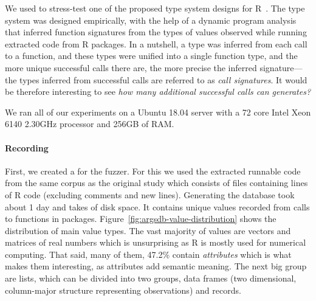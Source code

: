 \documentclass[sigplan,anonymous,review]{acmart}
\begin{document}
We used \tool to stress-test one of the proposed type system designs for R~\cite{turcotte2020designing}.
The type system was designed empirically, with the help of a dynamic program analysis that inferred function signatures from the types of values observed while running extracted code from R packages.
In a nutshell, a type was inferred from each call to a function, and these types were unified into a single function type, and the more unique successful calls there are, the more precise the inferred signature---the types inferred from successful calls are referred to as \textit{call signatures}.
It would be therefore interesting to see \emph{how many additional successful calls can \tool generates?}

We ran all of our experiments on a Ubuntu 18.04 server with a 72 core Intel Xeon 6140 2.30GHz processor and 256GB of RAM. 

\paragraph{Recording}

First, we created a \sxpdb for the fuzzer.
For this we used the extracted runnable code from the same corpus as the original study which consists of \DBNumSourceFiles files containing \DBSourceLinesOfCodeRnd lines of R code (excluding comments and new lines).
Generating the database took about 1 day  and takes \DBFileSize of disk space.
It contains \DBValuesRnd unique values recorded from \DBNumCallsRnd calls to \DBNumFunctionsRnd functions in \DBNumPackages packages.
Figure~\ref{fig:argsdb-value-distribution} shows the distribution of main value types.
The vast majority of values are vectors and matrices of real numbers which is unsurprising as R is mostly used for numerical computing.
That said, many of them, 47.2\%  contain \textit{attributes} which is what makes them interesting, as attributes add semantic meaning.
The next big group are lists, which can be divided into two groups, data frames (two dimensional, column-major structure representing observations) and records.
\end{document}
